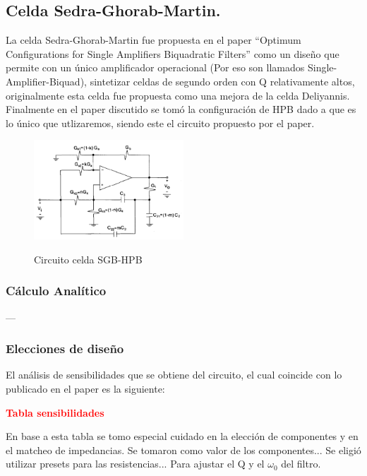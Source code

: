 \subsection{Celda Sedra-Ghorab-Martin.}
La celda Sedra-Ghorab-Martin fue propuesta en el paper ``Optimum Configurations for Single Amplifiers Biquadratic Filters'' como un diseño que permite con un único amplificador operacional (Por eso son llamados Single-Amplifier-Biquad), sintetizar celdas de segundo orden con Q relativamente altos, originalmente esta celda fue propuesta como una mejora de la celda Deliyannis.
Finalmente en el paper discutido se tomó la configuración de HPB dado a que es lo único que utlizaremos, siendo este el circuito propuesto por el paper.
\begin{figure}[H]
	\centering
	\includegraphics[width=0.5\textwidth]{Imagenes-Ej3/HPBSedra.PNG}
	\label{fig:HPBSedra}
	\caption{Circuito celda SGB-HPB}
\end{figure}
\subsubsection{Cálculo Analítico}
---
\subsubsection{Elecciones de diseño}
El análisis de sensibilidades que se obtiene del circuito, el cual coincide con lo publicado en el paper es la siguiente: 
\begin{center}
	\huge{\textcolor{red}{\textbf{Tabla sensibilidades}}}
\end{center}
En base a esta tabla se tomo especial cuidado en la elección de componentes y en el matcheo de impedancias.
Se tomaron como valor de los componentes...
Se eligió utilizar presets para las resistencias... Para ajustar el Q y el $\omega_0$ del filtro.
